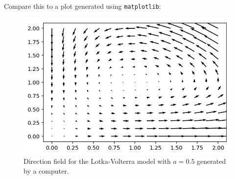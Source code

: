 Compare this to a plot generated using \texttt{matplotlib}:


\begin{figure}
  [h]
  \includegraphics[width=\columnwidth]{figures/lotka-volterra-direction-field.png}

  \caption{Direction field for the Lotka-Volterra model with $a = 0.5$ generated by a computer.}
\end{figure}

